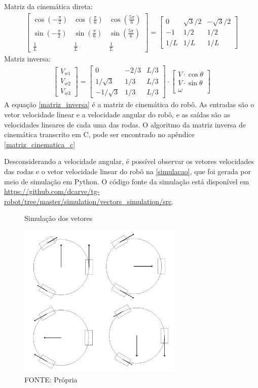 Matriz da cinemática direta:
\begin{gather}
	\begin{bmatrix}
		\cos{\left(-\frac{\pi}{2}\right)} & \cos{\left(\frac{\pi}{6}\right)} & \cos{\left(\frac{5\pi}{6}\right)} \\
		\sin{\left(-\frac{\pi}{2}\right)} & \sin{\left(\frac{\pi}{6}\right)} & \sin{\left(\frac{5\pi}{6}\right)} \\
		\frac{1}{L} & \frac{1}{L} & \frac{1}{L}
	\end{bmatrix}
	=
	\begin{bmatrix}
		0 & \sqrt{3}/2 & -\sqrt{3}/2 \\
		-1 & 1/2 & 1/2  \\
		1/L & 1/L & 1/L
	\end{bmatrix}
\end{gather}
Matriz inversa:
\begin{gather}
	\label{matriz_inversa}
	\begin{bmatrix} V_{w1} \\  V_{w2} \\  V_{w3} \end{bmatrix}
	=
	\begin{bmatrix}
		0 & -2/3 & L/3 \\
		1/\sqrt{3} & 1/3 & L/3\\
		-1/\sqrt{3} & 1/3 & L/3
	\end{bmatrix}
	\cdot
	\begin{bmatrix} V\cdot \cos{\theta} \\  V\cdot \sin{\theta} \\  \omega \end{bmatrix}
\end{gather}
A equação \eqref{matriz_inversa} é a matriz de cinemática do robô.
As entradas são o vetor velocidade linear e a velocidade angular do robô, e as
saídas são as velocidades lineares de cada uma das rodas.
O algoritmo da matriz inversa de cinemática transcrito em C, pode ser encontrado no apêndice \ref{matriz_cinematica_c}

Desconsiderando a velocidade angular, é possível observar os vetores velocidades
das rodas e o vetor velocidade linear do robô na \autoref{simulacao}, que
foi gerada por meio de simulação em Python. O código fonte da simulação está
disponível em \url{https://github.com/dcarve/tg-robot/tree/master/simulation/vectors_simulation/src}.

\begin{figure}[ht]
	\centering
	\caption{Simulação dos vetores}
	\includegraphics[width=0.7\textwidth]{figures/simulacao}
	\caption*{FONTE: Própria}
	\label{simulacao}
\end{figure}
